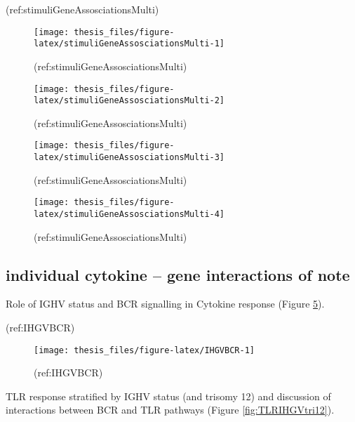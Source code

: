 \documentclass[11pt, a4paper, twosided]{book}
\begin{document}
(ref:stimuliGeneAssosciationsMulti)
\begin{figure}

{\centering \texttt{[image: thesis\_files/figure-latex/stimuliGeneAssosciationsMulti-1]} 

}

\caption{(ref:stimuliGeneAssosciationsMulti)}\label{fig:stimuliGeneAssosciationsMulti-1}
\end{figure}
\begin{figure}

{\centering \texttt{[image: thesis\_files/figure-latex/stimuliGeneAssosciationsMulti-2]} 

}

\caption{(ref:stimuliGeneAssosciationsMulti)}\label{fig:stimuliGeneAssosciationsMulti-2}
\end{figure}
\begin{figure}

{\centering \texttt{[image: thesis\_files/figure-latex/stimuliGeneAssosciationsMulti-3]} 

}

\caption{(ref:stimuliGeneAssosciationsMulti)}\label{fig:stimuliGeneAssosciationsMulti-3}
\end{figure}
\begin{figure}

{\centering \texttt{[image: thesis\_files/figure-latex/stimuliGeneAssosciationsMulti-4]} 

}

\caption{(ref:stimuliGeneAssosciationsMulti)}\label{fig:stimuliGeneAssosciationsMulti-4}
\end{figure}
\hypertarget{individual-cytokine-gene-interactions-of-note}{%
\subsection{individual cytokine -- gene interactions of note}\label{individual-cytokine-gene-interactions-of-note}}

Role of IGHV status and BCR signalling in Cytokine response
(Figure \ref{fig:IHGVBCR}).

(ref:IHGVBCR)
\begin{figure}

{\centering \texttt{[image: thesis\_files/figure-latex/IHGVBCR-1]} 

}

\caption{(ref:IHGVBCR)}\label{fig:IHGVBCR}
\end{figure}
TLR response stratified by IGHV status (and trisomy 12) and discussion of interactions between BCR and TLR pathways
(Figure \ref{fig:TLRIHGVtri12}).
\end{document}
